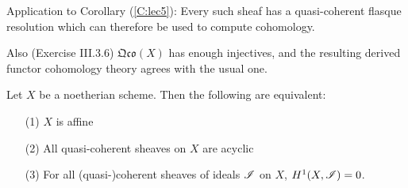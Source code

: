  \setcounter{lecture}{6}

Application to Corollary (\ref{C:lec5}): Every such sheaf has a
quasi-coherent flasque resolution which can therefore be used to
compute cohomology.

Also (Exercise III.3.6) $\mathfrak{Qco}(X)$ has enough injectives,
and the resulting derived functor cohomology theory agrees with
the usual one.

\begin{theorem}[Serre] Let $X$ be a noetherian scheme.  Then the
following are equivalent:
\begin{itemize}
 \item[(1)] $X$ is affine
 \item[(2)] All quasi-coherent sheaves on $X$ are acyclic
 \item[(3)] For all (quasi-)coherent sheaves of ideals $\mathscr{I}$ on
 $X$, $H^1(X,\mathscr{I})=0$.
\end{itemize}
\end{theorem}
